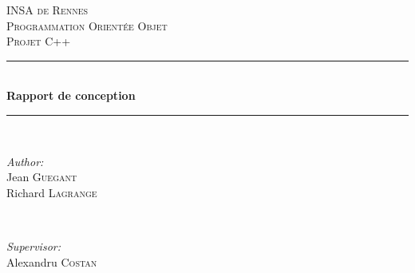 \begin{titlepage}

\newcommand{\HRule}{\rule{\linewidth}{0.5mm}} %

\center %
 

\textsc{\LARGE INSA de Rennes}\\[1.5cm] %
\textsc{\Large Programmation Orientée Objet}\\[0.5cm] %
\textsc{\large Projet C++}\\[0.5cm] %


\HRule \\[0.4cm]
{ \huge \bfseries Rapport de conception}\\[0.4cm] %
\HRule \\[1.5cm]
 

\begin{minipage}{0.4\textwidth}
\begin{flushleft} \large
\emph{Author:}\\
Jean \textsc{Guegant}\\ %
Richard \textsc{Lagrange} %
\end{flushleft}
\end{minipage}
~
\begin{minipage}{0.4\textwidth}
\begin{flushright} \large
\emph{Supervisor:} \\
Alexandru \textsc{Costan} %
\end{flushright}
\end{minipage}\\[4cm]



\end{titlepage}
